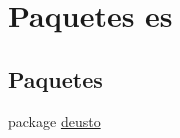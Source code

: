 \hypertarget{namespacees}{\section{Paquetes es}
\label{namespacees}
}
\subsection*{Paquetes}
\begin{DoxyCompactItemize}
\item 
package \hyperlink{namespacees_1_1deusto}{deusto}
\end{DoxyCompactItemize}
